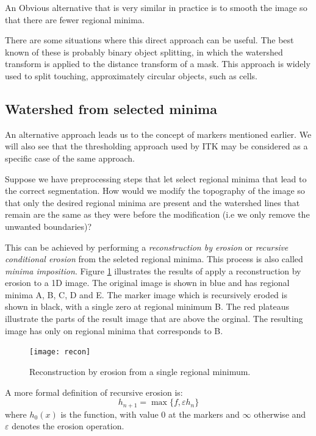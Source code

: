 \documentclass{InsightArticle}
\begin{document}
An Obvious alternative that is very similar in practice is to 
smooth the image so that there are fewer regional minima.

There are some situations where this direct approach can be
useful. The best known of these is probably binary object splitting,
in which the watershed transform is applied to the distance transform
of a mask. This approach is widely used to split touching,
approximately circular objects, such as cells.

\subsection{Watershed from selected minima}
\label{sect:ws-selected-minima}
An alternative approach leads us to the concept of markers mentioned
earlier. We will also see that the thresholding approach used by ITK
may be considered as a specific case of the same approach.

Suppose we have preprocessing steps that let select regional minima
that lead to the correct segmentation. How would we modify the
topography of the image so that only the desired regional minima are
present and the watershed lines that remain are the same as they were
before the modification (i.e we only remove the unwanted boundaries)?

This can be achieved by performing a {\em reconstruction by erosion}
or {\em recursive conditional erosion} from the seleted regional
minima. This process is also called {\em minima imposition}. Figure
\ref{fig:recon} illustrates the results of apply a
reconstruction by erosion to a 1D image. The original image is shown
in blue and has regional minima A, B, C, D and E. The marker image
which is recursively eroded is shown in black, with a single zero at
regional minimum B. The red plateaus illustrate the parts of the
result image that are above the orginal. The resulting image has only
on regional minima that corresponds to B.
\begin{figure}[htbp]
\begin{center}
\texttt{[image: recon]}
\caption{Reconstruction by erosion from a single regional minimum.}
\label{fig:recon}
\end{center}
\end{figure}

A more formal definition of recursive erosion is:
\begin{equation}
\label{eq:recon_erosion}
h_{n+1}=\max\{f, \varepsilon h_n\}
\end{equation}
where $h_0(x)$ is the function, with value 0 at the markers and
$\infty$ otherwise and $\varepsilon$ denotes the erosion
operation.
\end{document}
